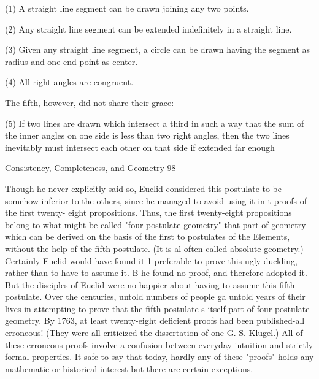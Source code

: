       (1) A straight line segment can be drawn joining any two points.

      (2) Any straight line segment can be extended indefinitely in a straight line.

      (3) Given any straight line segment, a circle can be drawn having the segment as
           radius and one end point as center.

      (4) All right angles are congruent.

The fifth, however, did not share their grace:

      (5) If two lines are drawn which intersect a third in such a way that the sum of the
            inner angles on one side is less than two right angles, then the two lines
            inevitably must intersect each other on that side if extended far enough




Consistency, Completeness, and Geometry                                                 98

Though he never explicitly said so, Euclid considered this postulate to be somehow
inferior to the others, since he managed to avoid using it in t proofs of the first twenty-
eight propositions. Thus, the first twenty-eight propositions belong to what might be
called "four-postulate geometry" that part of geometry which can be derived on the basis
of the first to postulates of the Elements, without the help of the fifth postulate. (It is al
often called absolute geometry.) Certainly Euclid would have found it 1 preferable to
prove this ugly duckling, rather than to have to assume it. B he found no proof, and
therefore adopted it.
         But the disciples of Euclid were no happier about having to assume this fifth
postulate. Over the centuries, untold numbers of people ga untold years of their lives in
attempting to prove that the fifth postulate s itself part of four-postulate geometry. By
1763, at least twenty-eight deficient proofs had been published-all erroneous! (They were
all criticized the dissertation of one G. S. Klugel.) All of these erroneous proofs involve a
confusion between everyday intuition and strictly formal properties. It safe to say that
today, hardly any of these "proofs" holds any mathematic or historical interest-but there
are certain exceptions.

